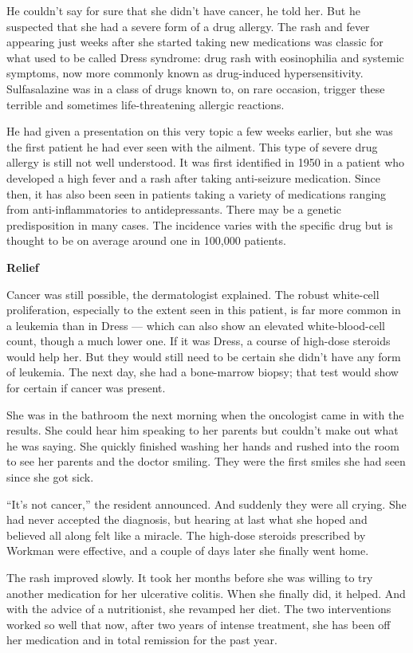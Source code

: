 He couldn't say for sure that she didn't have cancer, he told her. But
he suspected that she had a severe form of a drug allergy. The rash and
fever appearing just weeks after she started taking new medications was
classic for what used to be called Dress syndrome: drug rash with
eosinophilia and systemic symptoms, now more commonly known as
drug-induced hypersensitivity. Sulfasalazine was in a class of drugs
known to, on rare occasion, trigger these terrible and sometimes
life-threatening allergic reactions.

He had given a presentation on this very topic a few weeks earlier, but
she was the first patient he had ever seen with the ailment. This type
of severe drug allergy is still not well understood. It was first
identified in 1950 in a patient who developed a high fever and a rash
after taking anti-seizure medication. Since then, it has also been seen
in patients taking a variety of medications ranging from
anti-inflammatories to antidepressants. There may be a genetic
predisposition in many cases. The incidence varies with the specific
drug but is thought to be on average around one in 100,000 patients.

\textbf{Relief}

Cancer was still possible, the dermatologist explained. The robust
white-cell proliferation, especially to the extent seen in this patient,
is far more common in a leukemia than in Dress --- which can also show
an elevated white-blood-cell count, though a much lower one. If it was
Dress, a course of high-dose steroids would help her. But they would
still need to be certain she didn't have any form of leukemia. The next
day, she had a bone-marrow biopsy; that test would show for certain if
cancer was present.

She was in the bathroom the next morning when the oncologist came in
with the results. She could hear him speaking to her parents but
couldn't make out what he was saying. She quickly finished washing her
hands and rushed into the room to see her parents and the doctor
smiling. They were the first smiles she had seen since she got sick.

``It's not cancer,'' the resident announced. And suddenly they were all
crying. She had never accepted the diagnosis, but hearing at last what
she hoped and believed all along felt like a miracle. The high-dose
steroids prescribed by Workman were effective, and a couple of days
later she finally went home.

The rash improved slowly. It took her months before she was willing to
try another medication for her ulcerative colitis. When she finally did,
it helped. And with the advice of a nutritionist, she revamped her diet.
The two interventions worked so well that now, after two years of
intense treatment, she has been off her medication and in total
remission for the past year.

